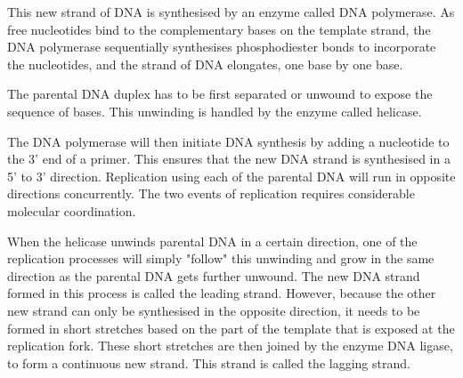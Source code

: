 \documentclass[11pt]{article}
\begin{document}
This new strand of DNA is synthesised by an enzyme called DNA polymerase. As free nucleotides bind to the complementary bases on the template strand, the DNA polymerase sequentially synthesises phosphodiester bonds to incorporate the nucleotides, and the strand of DNA elongates, one base by one base.


The parental DNA duplex has to be first separated or unwound to expose the sequence of bases. This unwinding is handled by the enzyme called helicase.


The DNA polymerase will then initiate DNA synthesis by adding a nucleotide to the 3' end of a primer. This ensures that the new DNA strand is synthesised in a 5' to 3' direction. Replication using each of the parental DNA will run in opposite directions concurrently. The two events of replication requires considerable molecular coordination.


When the helicase unwinds parental DNA in a certain direction, one of the replication processes will simply "follow" this unwinding and grow in the same direction as the parental DNA gets further unwound. The new DNA strand formed in this process is called the leading strand. However, because the other new strand can only be synthesised in the opposite direction, it needs to be formed in short stretches based on the part of the template that is exposed at the replication fork. These short stretches are then joined by the enzyme DNA ligase, to form a  continuous new strand. This strand is called the lagging strand.

\newpage
\end{document}
